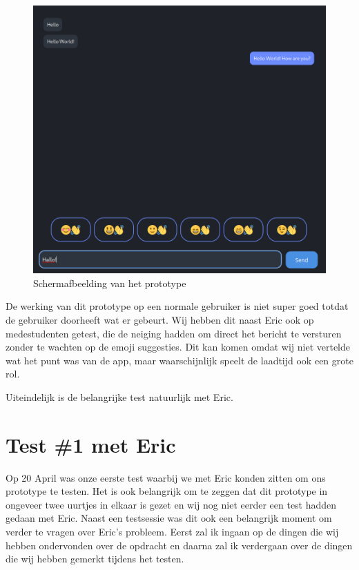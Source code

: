 \documentclass[12pt]{article}
\begin{document}
\begin{figure}[h]
	\centering
	\includegraphics[width=1\textwidth]{eerste_prototype_1}
	\caption{Schermafbeelding van het prototype}
	\label{fig:eerste_prototype}
\end{figure}

De werking van dit prototype op een normale gebruiker is niet super goed totdat de gebruiker doorheeft wat er gebeurt.
Wij hebben dit naast Eric ook op medestudenten getest, die de neiging hadden om direct het bericht te versturen zonder te wachten op de emoji suggesties.
Dit kan komen omdat wij niet vertelde wat het punt was van de app, maar waarschijnlijk speelt de laadtijd ook een grote rol.

Uiteindelijk is de belangrijke test natuurlijk met Eric.

\clearpage\section{Test \#1 met Eric}

Op 20 April was onze eerste test waarbij we met Eric konden zitten om ons prototype te testen.
Het is ook belangrijk om te zeggen dat dit prototype in ongeveer twee uurtjes in elkaar is gezet en wij nog niet eerder een test hadden gedaan met Eric.
Naast een testsessie was dit ook een belangrijk moment om verder te vragen over Eric's probleem.
Eerst zal ik ingaan op de dingen die wij hebben ondervonden over de opdracht en daarna zal ik verdergaan over de dingen die wij hebben gemerkt tijdens het testen.
\end{document}
